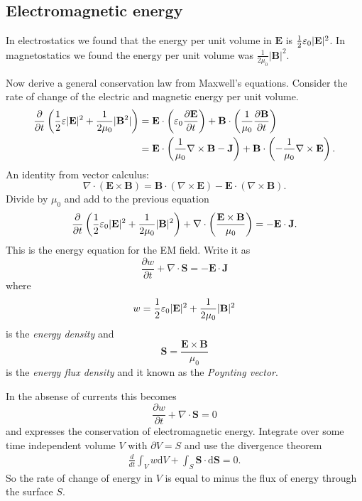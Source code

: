 \documentclass{article}
\begin{document}
\subsection{Electromagnetic energy}
In electrostatics we found that the energy per unit volume in $ \mathbf E $ is $ \frac 12 \varepsilon_0 |\mathbf E|^2 $. In magnetostatics we found the energy per unit volume was $ \frac 1{2\mu_0}|\mathbf B|^2 $. \par
Now derive a general conservation law from Maxwell's equations. Consider the rate of change of the electric and magnetic energy per unit volume. \begin{align*}
	\frac\partial{\partial t}\left(\frac 12 \varepsilon |\mathbf E|^2 + \frac 1{2\mu_0} |\mathbf B^2|\right) &= \mathbf E\cdot\left(\varepsilon_0\frac{\partial \mathbf E}{\partial t}\right) + \mathbf B \cdot\left(\frac 1{\mu_0}\frac{\partial \mathbf B}{\partial t}\right)\\
													 &= \mathbf E \cdot\left(\frac 1{\mu_0}\nabla\times\mathbf B - \mathbf J\right) + \mathbf B\cdot\left(-\frac 1{\mu_0} \nabla\times\mathbf E\right).
\end{align*}
An identity from vector calculus:
\[
  \nabla\cdot(\mathbf E\times\mathbf B) = \mathbf B\cdot(\nabla\times\mathbf E)-\mathbf E\cdot(\nabla\times\mathbf B).
\]
Divide by $ \mu_0 $ and add to the previous equation
\[
	\frac{\partial}{\partial t} \left(\frac 12 \varepsilon_0 |\mathbf E|^2+\frac 1{2\mu_0}|\mathbf B|^2\right) + \nabla\cdot\left(\frac{\mathbf E\times\mathbf B}{\mu_0}\right) = -\mathbf E \cdot\mathbf J.
\]
This is the energy equation for the EM field. Write it as
\[
	\frac{\partial w}{\partial t} + \nabla\cdot\mathbf S = -\mathbf E \cdot\mathbf J
\]
where
\[
	w = \frac 12 \varepsilon_0 |\mathbf E|^2 + \frac 1{2\mu_0}|\mathbf B|^2
\]
is the \textit{energy density} and 
\[
	\mathbf S = \frac{\mathbf E\times\mathbf B}{\mu_0}
\]
is the \textit{energy flux density} and it known as the \textit{Poynting vector}.\par
In the absense of currents this becomes
\[
	\frac{\partial w}{\partial t} + \nabla\cdot\mathbf S = 0
\]
and expresses the conservation of electromagnetic energy. Integrate over some time independent volume $ V $ with $ \partial V = S $ and use the divergence theorem
\begin{align*}
	\frac{d}{dt} \int_V w\mathrm dV + \int_S \mathbf S \cdot\mathrm d\mathbf S = 0.
\end{align*}
So the rate of change of energy in $ V $ is equal to minus the flux of energy through the surface $ S $.\par
\end{document}
